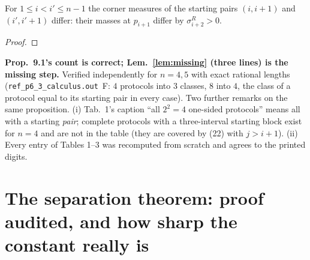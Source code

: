 \documentclass[11pt]{article}
\theoremstyle{definition}\newtheorem{example}[theorem]{Example}
\begin{document}
\begin{lemma}\label{lem:missing}
For $1\le i<i'\le n-1$ the corner measures of the starting pairs $(i,i+1)$ and
$(i',i'+1)$ differ: their masses at $p_{i+1}$ differ by $\sigma^R_{i+2}>0$.
\end{lemma}
\begin{proof}
 
\end{proof}

\begin{verdictgap}
\textbf{Prop.~9.1's count is correct; Lem.~\ref{lem:missing} (three lines) is the missing
step.}  Verified independently for $n=4,5$ with exact rational lengths
(\texttt{ref\_p6\_3\_calculus.out}~F: $4$ protocols into $3$ classes, $8$ into $4$, the
class of a protocol equal to its starting pair in every case).  Two further remarks on the
same proposition.  (i) Tab.~1's caption ``all $2^2=4$ one-sided protocols'' means all with
a starting \emph{pair}; complete protocols with a three-interval starting block exist for
$n=4$ and are not in the table (they are covered by (22) with $j>i+1$).  (ii) Every entry
of Tables 1--3 was recomputed from scratch and agrees to the printed digits.
\end{verdictgap}


\section{The separation theorem: proof audited, and how sharp the constant really
is}\label{sec:d6}
\end{document}
